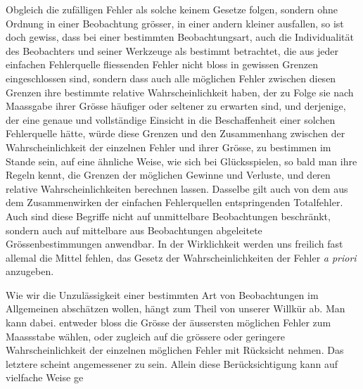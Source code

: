 Obgleich die zufälligen Fehler als solche keinem Gesetze folgen, sondern ohne Ordnung in einer Beobachtung grösser, in einer andern kleiner ausfallen, so ist doch gewiss, dass bei einer bestimmten Beobachtungsart, auch die Individualität des Beobachters und seiner Werkzeuge als bestimmt betrachtet, die aus jeder einfachen Fehlerquelle fliessenden Fehler nicht bloss in gewissen Grenzen eingeschlossen sind, sondern dass auch alle möglichen Fehler zwischen diesen Grenzen ihre bestimmte relative Wahrscheinlichkeit haben, der zu Folge sie nach Maassgabe ihrer Grösse häufiger oder seltener zu erwarten sind, und derjenige, der eine genaue und vollständige Einsicht in die Beschaffenheit einer solchen Fehlerquelle hätte, würde diese Grenzen und den Zusammenhang zwischen der Wahrscheinlichkeit der einzelnen Fehler und ihrer Grösse, zu bestimmen im Stande sein, auf eine ähnliche Weise, wie sich bei Glücksspielen, so bald man ihre Regeln kennt, die Grenzen der möglichen Gewinne und Verluste, und deren relative Wahrscheinlichkeiten berechnen lassen. Dasselbe gilt auch von dem aus dem Zusammenwirken der einfachen Fehlerquellen entspringenden Totalfehler. Auch sind diese Begriffe nicht auf unmittelbare Beobachtungen beschränkt, sondern auch auf mittelbare aus Beobachtungen abgeleitete Grössenbestimmungen anwendbar. In der Wirklichkeit werden uns freilich fast allemal die Mittel fehlen, das Gesetz der Wahrscheinlichkeiten der Fehler \textit{a priori} anzugeben.

Wie wir die Unzulässigkeit einer bestimmten Art von Beobachtungen im Allgemeinen abschätzen wollen, hängt zum Theil von unserer Willkür ab. Man kann dabei. entweder bloss die Grösse der äussersten möglichen Fehler zum Maassstabe wählen, oder zugleich auf die grössere oder geringere Wahrscheinlichkeit der einzelnen möglichen Fehler mit Rücksicht nehmen. Das letztere scheint angemessener zu sein. Allein diese Berücksichtigung kann auf vielfache Weise ge%
